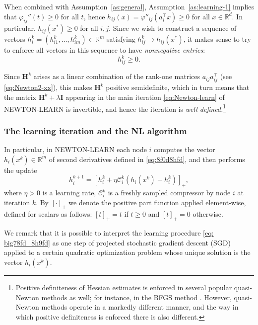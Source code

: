 \documentclass[12pt]{article}
\newcommand{\R}{\mathbb{R}}
\newcommand{\newalpha}{h}
\newcommand{\mH}{\mathbf{H}}
\newcommand{\mI}{\mathbf{I}}
\newcommand{\cC}{{\mathcal{C}}}
\begin{document}
When combined with  Assumption~\ref{as:general}, Assumption~\ref{as:learning-1} implies that $\varphi_{ij}''(t)\geq 0$ for all $t$, hence $h_{ij}(x) = \varphi''_{ij}(a_i^\top x)\geq 0$ for all $x\in \R^d$. In particular, $h_{ij}(x^*) \geq 0$ for all $i,j$. Since we wish to construct a sequence of vectors $h_i^k = (h_{i1}^k, \dots, h_{im}^k)\in \R^m$ satisfying $h_{ij}^k \to h_{ij}(x^*)$, it makes sense to try to enforce all vectors in this sequence to have {\em nonnegative entries}: $$h_{ij}^k\geq 0.$$

 Since  $\mH^k$ arises as a linear combination of the rank-one matrices $a_{ij}a_{ij}^\top$ (see \eqref{eq:Newton2-xx}), this makes  $\mH^k$ positive semidefinite, which in turn means that the matrix $\mH^k + \lambda \mI$ appearing in the main iteration \eqref{eq:Newton-learn} of {\sf NEWTON-LEARN} is invertible, and hence the iteration is {\em well defined.}\footnote{Positive definiteness of Hessian estimates is enforced in several popular quasi-Newton methods as well; for instance, in the BFGS method \cite{Broyden1967, Fletcher1970, Goldfarb1970, shanno1970conditioning}. However, quasi-Newton methods operate in a markedly different manner, and the way in which positive definiteness is enforced there is also different.} 
 
 
 
\subsubsection{The learning iteration and the {\sf NL} algorithm}

 In particular, in {\sf NEWTON-LEARN} each node $i$  computes the vector $\newalpha_i(x^k)\in \R^m$  of second derivatives defined in \eqref{eq:8f0d8hfd}, and then performs the update
\begin{equation}\label{eq: big78fd_8h9fd}\boxed{\quad h^{k+1}_i = \left[h^k_i + \eta \cC_i^k(\newalpha_i(x^k) - h^k_i) \right]_+, \quad}\end{equation}
where $\eta>0$ is a learning rate, $\cC_i^k$ is a freshly sampled compressor by node $i$ at iteration $k$. By $[\cdot ]_+$ we denote the positive part function applied element-wise, defined for scalars as follows: $[t ]_+ = t$ if $t\geq 0$ and  $[t ]_+ = 0$ otherwise. 

We remark that it is possible to interpret the learning procedure \eqref{eq: big78fd_8h9fd}  as one step of projected stochastic gradient descent (SGD)  applied to a certain quadratic optimization problem whose unique solution is the vector $\newalpha_i(x^k)$. 
\end{document}
